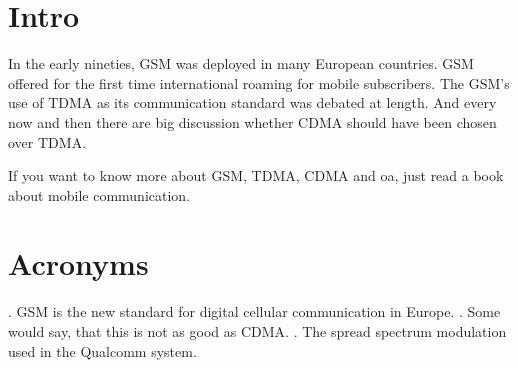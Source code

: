 \documentclass{article}
\begin{document}
\section{Intro}
In the early nineties, \acs{GSM} was deployed in many European
countries. \ac{GSM} offered for the first time international
roaming for mobile subscribers. The \acs{GSM}'s use of \ac{TDMA} as
its communication standard was debated at length. And every now
and then there are big discussion whether \ac{CDMA} should have
been chosen over \ac{TDMA}.

If you want to know more about \acf{GSM}, \acf{TDMA}, \acf{CDMA}
and \ac{oa}, just read a book about mobile communication.
\section{Acronyms}
\begin{acronym}
 .
      \acs{GSM} is the new standard for digital cellular
      communication in Europe.
 .
      Some would say, that this is not as good as \ac{CDMA}.
 . The spread spectrum
      modulation used in the Qualcomm system.
\end{acronym}
\end{document}
